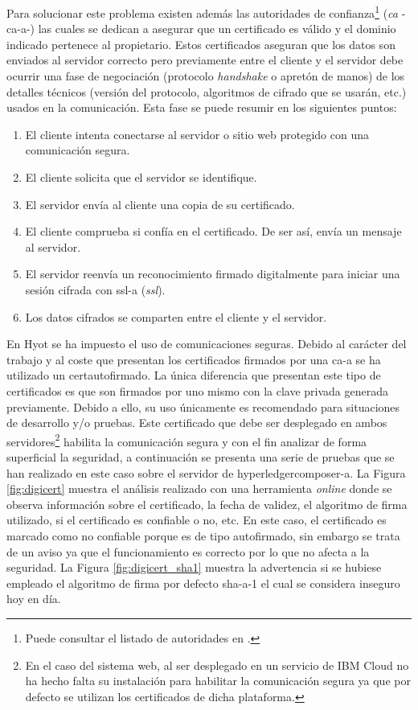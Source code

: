 \documentclass[12pt,a4paper, twoside]{report}
\begin{document}
	Para solucionar este problema existen además las autoridades de confianza\footnote{Puede consultar el listado de autoridades en \cite{cab:members}.} (\textit{\gls{ca}} -\gls{ca-a}-) las cuales se dedican a asegurar que un certificado es válido y el dominio indicado pertenece al propietario. Estos certificados aseguran que los datos son enviados al servidor correcto pero previamente entre el cliente y el servidor debe ocurrir una fase de negociación (protocolo \textit{handshake} o apretón de manos) de los detalles técnicos (versión del protocolo, algoritmos de cifrado que se usarán, etc.) usados en la comunicación. Esta fase se puede resumir en los siguientes puntos:
	
	\begin{enumerate}
		\item El cliente intenta conectarse al servidor o sitio web protegido con una comunicación segura.
		\item El cliente solicita que el servidor se identifique.
		\item El servidor envía al cliente una copia de su certificado. 
		\item El cliente comprueba si confía en el certificado. De ser así, envía un mensaje al servidor.
		\item El servidor reenvía un reconocimiento firmado digitalmente para iniciar una sesión cifrada con \gls{ssl-a} (\textit{\gls{ssl}}).
		\item Los datos cifrados se comparten entre el cliente y el servidor.
	\end{enumerate}

	En Hyot se ha impuesto el uso de comunicaciones seguras. Debido al carácter del trabajo y al coste que presentan los certificados firmados por una \gls{ca-a} se ha utilizado un \gls{certautofirmado}. La única diferencia que presentan este tipo de certificados es que son firmados por uno mismo con la clave privada generada previamente. Debido a ello, su uso únicamente es recomendado para situaciones de desarrollo y/o pruebas. Este certificado que debe ser desplegado en ambos servidores\footnote{En el caso del sistema web, al ser desplegado en un servicio de IBM Cloud no ha hecho falta su instalación para habilitar la comunicación segura ya que por defecto se utilizan los certificados de dicha plataforma.} habilita la comunicación segura y con el fin analizar de forma superficial la seguridad, a continuación se presenta una serie de pruebas que se han realizado en este caso sobre el servidor de \gls{hyperledgercomposer-a}. La Figura \ref{fig:digicert} muestra el análisis realizado con una herramienta \textit{online} donde se observa información sobre el certificado, la fecha de validez, el algoritmo de firma utilizado, si el certificado es confiable o no, etc. En este caso, el certificado es marcado como no confiable porque es de tipo autofirmado, sin embargo se trata de un aviso ya que el funcionamiento es correcto por lo que no afecta a la seguridad. La Figura \ref{fig:digicert_sha1} muestra la advertencia si se hubiese empleado el algoritmo de firma por defecto \gls{sha-a}-1 el cual se considera inseguro hoy en día.	
		
\end{document}
